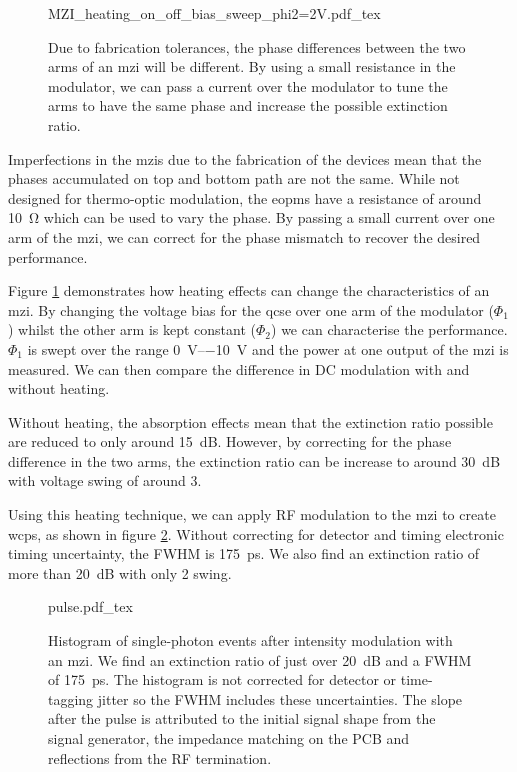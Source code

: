 \begin{figure}[tp]
	\centering
	\small
	\def\svgwidth{0.8\textwidth} 
	{MZI_heating_on_off_bias_sweep_phi2=2V.pdf_tex}
	\caption[MZI optimisation through thermo-optic modulation]{Due to fabrication tolerances, the phase differences between the two arms of an \ac{mzi} will be different. By using a small resistance in the modulator, we can pass a current over the modulator to tune the arms to have the same phase and increase the possible extinction ratio.}
	\label{fig:mzi_heating}
\end{figure}

Imperfections in the \acp{mzi} due to the fabrication of the devices mean that the phases accumulated on top and bottom path are not the same. While not designed for thermo-optic modulation, the \acp{eopm} have a resistance of around \SI{10}{\ohm} which can be used to vary the phase. By passing a small current over one arm of the \ac{mzi}, we can correct for the phase mismatch to recover the desired performance.

Figure \ref{fig:mzi_heating} demonstrates how heating effects can change the characteristics of an \ac{mzi}. By changing the voltage bias for the \ac{qcse} over one arm of the modulator ($\Phi_1$) whilst the other arm is kept constant ($\Phi_2$) we can characterise the performance. $\Phi_1$ is swept over the range \SIrange{0}{-10}{V} and the power at one output of the \ac{mzi} is measured. We can then compare the difference in DC modulation with and without heating. 

Without heating, the absorption effects mean that the extinction ratio possible are reduced to only around \SI{15}{dB}. However, by correcting for the phase difference in the two arms, the extinction ratio can be increase to around \SI{30}{dB} with voltage swing of around \SI{3}{\Vpp}. 

Using this heating technique, we can apply RF modulation to the \ac{mzi} to create \acp{wcp}, as shown in figure \ref{fig:pulses}. Without correcting for detector and timing electronic timing uncertainty, the \ac{FWHM} is \SI{175}{ps}. We also find an extinction ratio of more than \SI{20}{dB} with only \SI{2}{\Vpp} swing.

\begin{figure}[tp]
	\centering
	\small
	\def\svgwidth{0.8\textwidth} 
	{pulse.pdf_tex}
	\caption[On-chip intensity modulation of coherent states]{Histogram of single-photon events after intensity modulation with an \ac{mzi}. We find an extinction ratio of just over \SI{20}{dB} and a \ac{FWHM} of \SI{175}{\ps}. The histogram is not corrected for detector or time-tagging jitter so the \ac{FWHM} includes these uncertainties. The slope after the pulse is attributed to the initial signal shape from the signal generator, the impedance matching on the PCB and reflections from the RF termination.}
	\label{fig:pulses}
\end{figure}

